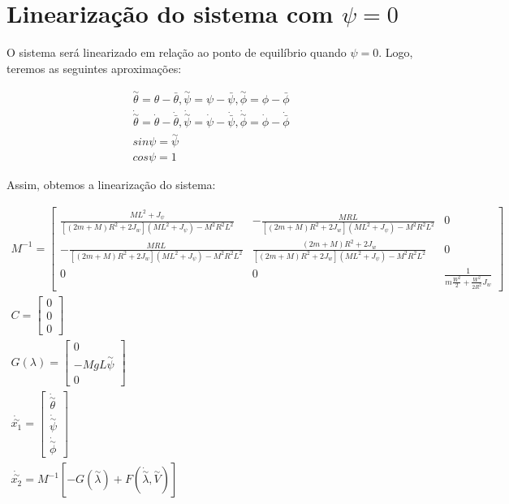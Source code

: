 \documentclass[10pt]{article}
\begin{document}
\section{Linearização do sistema com $\psi = 0$}

\quad O sistema será linearizado em relação ao ponto de equilíbrio quando $\psi = 0$. Logo,
teremos as seguintes aproximações:

\begin{equation}
\begin{gathered}
    \overset{\sim}{\theta} = \theta - \bar\theta ,
    \overset{\sim}{\psi} = \psi - \bar\psi ,
    \overset{\sim}{\phi} = \phi - \bar\phi \\
    \dot{\overset{\sim}{\theta}} = \dot\theta - \dot{\bar\theta} ,
    \dot{\overset{\sim}{\psi}} = \dot\psi - \dot{\bar\psi} ,
    \dot{\overset{\sim}{\phi}} = \dot\phi - \dot{\bar\phi} \\
    sin{\psi} = \overset{\sim}{\psi} \\
    cos{\psi} = 1
\end{gathered}
\end{equation}

\quad Assim, obtemos a linearização do sistema:

\begin{equation}
\begin{gathered}
    M^{-1} =
    \begin{bmatrix}
        \frac{ML^2 + J_\psi}{[(2m + M)R^2 + 2J_w](ML^2 + J_\psi) - M^2R^2L^2} & -\frac{MRL}{[(2m + M)R^2 + 2J_w](ML^2 + J_\psi) - M^2R^2L^2} & 0 \\
        -\frac{MRL}{[(2m + M)R^2 + 2J_w](ML^2 + J_\psi) - M^2R^2L^2} & \frac{(2m + M)R^2 + 2J_w}{[(2m + M)R^2 + 2J_w](ML^2 + J_\psi) - M^2R^2L^2} & 0 \\
        0 & 0 & \frac{1}{m\frac{W^2}{2} + \frac{W^2}{2R^2}J_w}
    \end{bmatrix} \\
    C =
    \begin{bmatrix}
        0 \\ 0 \\ 0
    \end{bmatrix} \\
    G(\lambda) =
    \begin{bmatrix}
        0 \\ -MgL\overset{\sim}{\psi} \\ 0
    \end{bmatrix} \\
    \dot{\overset{\sim}{x_1}} = \begin{bmatrix}
        \dot{\overset{\sim}{\theta}} \\
        \dot{\overset{\sim}{\psi}} \\
        \dot{\overset{\sim}{\phi}}
    \end{bmatrix} \\
    \dot{\overset{\sim}{x_2}} = M^{-1} \left[ - G( \overset{\sim}{\lambda} ) + F( \dot{\overset{\sim}{\lambda}} , \overset{\sim}{V} ) \right]
\end{gathered}
\end{equation}
\end{document}
